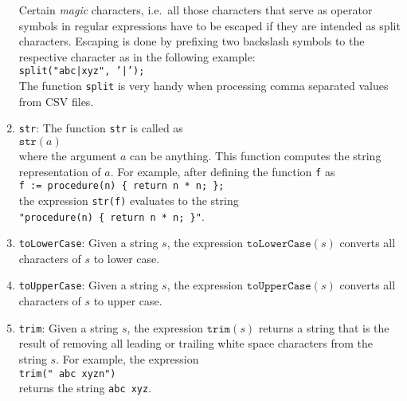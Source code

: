 \begin{enumerate}
      Certain \emph{magic} characters, i.e.~all those characters that serve as operator
      symbols in regular expressions have to be escaped if they are intended as split
      characters.  Escaping is done by prefixing two backslash symbols to the respective 
      character as in the following example:
      \\[0.2cm]
      \hspace*{1.3cm}
      \texttt{split("abc|xyz", '|');}
      \\[0.2cm]
      The function \texttt{split} is very handy when processing comma separated values from
      \textsc{CSV} files.
\item \texttt{str}:  The function \texttt{str} is called as
      \\[0.2cm]
      \hspace*{1.3cm}
      $\texttt{str}(a)$
      \\[0.2cm]
      where the argument $a$ can be anything.  This function computes the string
      representation of $a$.  For example, after defining the function \texttt{f} as
      \\[0.2cm]
      \hspace*{1.3cm}
      \texttt{f := procedure(n) \{ return n * n; \};}
      \\[0.2cm]
      the expression \texttt{str(f)} evaluates to the string
      \\[0.2cm]
      \hspace*{1.3cm}
      \texttt{"procedure(n) \{ return n * n; \}"}.      
\item \texttt{toLowerCase}:  Given a string $s$, the expression $\texttt{toLowerCase}(s)$
      converts all characters of $s$ to lower case.
\item \texttt{toUpperCase}:  Given a string $s$, the expression $\texttt{toUpperCase}(s)$
      converts all characters of $s$ to upper case.
\item \texttt{trim}:  Given a string $s$, the expression $\mathtt{trim}(s)$ returns a
      string that is the result of removing all leading or trailing white space characters from the
      string $s$.  For example, the expression
      \\[0.2cm]
      \hspace*{1.3cm}
      \texttt{trim("  abc xyzn")}
      \\[0.2cm]
      returns the string \texttt{abc xyz}.
\end{enumerate}

